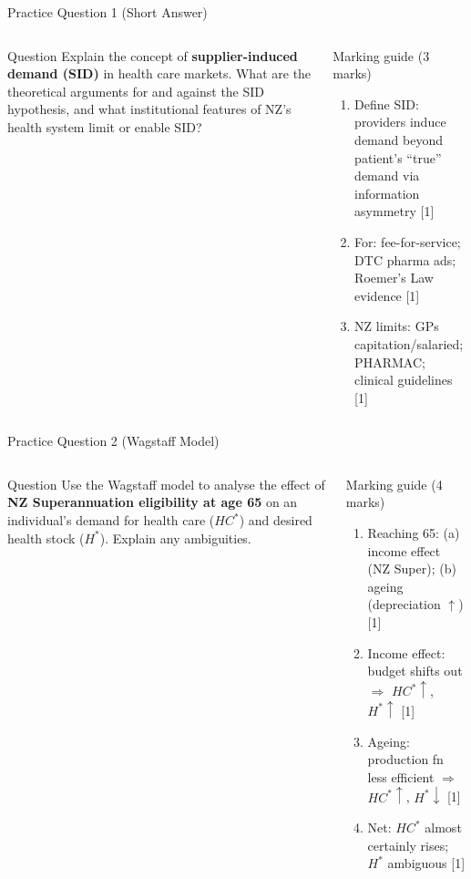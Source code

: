 \documentclass[aspectratio=169, 12pt]{beamer}
\begin{document}
\begin{frame}{Practice Question 1 (Short Answer)}
  \begin{columns}
      \begin{block}{Question}
        \small Explain the concept of \textbf{supplier-induced demand (SID)} in health care markets.
        What are the theoretical arguments for and against the SID hypothesis, and what
        institutional features of NZ's health system limit or enable SID?
      \end{block}
      \begin{alertblock}{Marking guide (3 marks)}
        \small
        \begin{enumerate}
          \item Define SID: providers induce demand beyond patient's ``true'' demand via information asymmetry \hfill[1]
          \item For: fee-for-service; DTC pharma ads; Roemer's Law evidence \hfill[1]
          \item NZ limits: GPs capitation/salaried; PHARMAC; clinical guidelines \hfill[1]
        \end{enumerate}
      \end{alertblock}
  \end{columns}
\end{frame}

\begin{frame}{Practice Question 2 (Wagstaff Model)}
  \begin{columns}
      \begin{block}{Question}
        \small Use the Wagstaff model to analyse the effect of \textbf{NZ Superannuation eligibility at age 65} on an individual's demand for health care ($HC^*$) and desired health stock ($H^*$). Explain any ambiguities.
      \end{block}
      \begin{alertblock}{Marking guide (4 marks)}
        \small
        \begin{enumerate}
          \item Reaching 65: (a) income effect (NZ Super); (b) ageing (depreciation $\uparrow$) \hfill[1]
          \item Income effect: budget shifts out $\Rightarrow$ $HC^*\uparrow$, $H^*\uparrow$ \hfill[1]
          \item Ageing: production fn less efficient $\Rightarrow$ $HC^*\uparrow$, $H^*\downarrow$ \hfill[1]
          \item Net: $HC^*$ almost certainly rises; $H^*$ ambiguous \hfill[1]
        \end{enumerate}
      \end{alertblock}
  \end{columns}
\end{frame}
\end{document}
